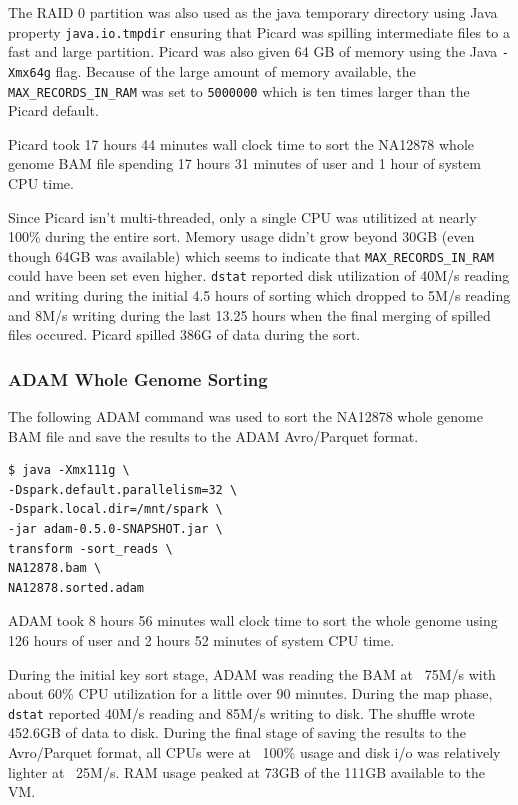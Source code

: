 \documentclass[10pt,twocolumn]{article}
\theoremstyle{plain}
\begin{document}
The RAID 0 partition was also used as the java temporary directory using Java property
\texttt{java.io.tmpdir} ensuring that Picard was spilling intermediate files to a fast and large partition.
Picard was also given 64 GB of memory using the Java \texttt{-Xmx64g} flag. Because of the large amount of memory available,
the \texttt{MAX\_RECORDS\_IN\_RAM} was set to \texttt{5000000} which is ten times larger than the Picard default.

Picard took 17 hours 44 minutes wall clock time to sort the NA12878 whole genome BAM file spending 17 hours 31 minutes of user and
1 hour of system CPU time.

Since Picard isn't multi-threaded, only a
single CPU was utilitized at nearly 100\% during the entire sort. Memory usage didn't grow beyond 30GB (even
though 64GB was available) which seems to indicate that \texttt{MAX\_RECORDS\_IN\_RAM} could have been set even higher.
\texttt{dstat} reported disk utilization of 40M/s reading and writing during the initial 4.5 hours of sorting which
dropped to 5M/s reading and 8M/s writing during the last 13.25 hours when the final merging of spilled files occured.
Picard spilled 386G of data during the sort.

\subsubsection{ADAM Whole Genome Sorting}
\label{sec:single-sort-adam}

The following ADAM command was used to sort the NA12878 whole genome BAM file and save the results to the 
ADAM Avro/Parquet format.

\begin{lstlisting}
$ java -Xmx111g \
-Dspark.default.parallelism=32 \
-Dspark.local.dir=/mnt/spark \
-jar adam-0.5.0-SNAPSHOT.jar \
transform -sort_reads \
NA12878.bam \
NA12878.sorted.adam
\end{lstlisting}

ADAM took 8 hours 56 minutes wall clock time to sort the whole genome using 126 hours of user and 2 hours 52 minutes of 
system CPU time. 

During the initial key sort stage, ADAM was reading the BAM at ~75M/s with about 60\% CPU utilization for a little over
90 minutes. During the map phase, \texttt{dstat} reported 40M/s reading and 85M/s writing to disk. The shuffle wrote
452.6GB of data to disk. During the final stage of saving the results to the Avro/Parquet format, all CPUs were at
~100\% usage and disk i/o was relatively lighter at ~25M/s. RAM usage peaked at 73GB of the 111GB available to the VM.
\end{document}
